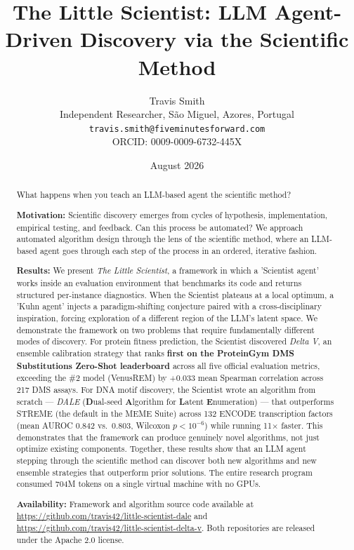 \documentclass[11pt,a4paper]{article}
\title{The Little Scientist: LLM Agent-Driven Discovery via the Scientific Method}
\author{Travis Smith\\
\small Independent Researcher, S\~ao Miguel, Azores, Portugal\\
\texttt{travis.smith@fiveminutesforward.com}\\
\small ORCID: 0009-0009-6732-445X}
\date{August 2026}
\begin{document}
\maketitle

\begin{abstract}
\noindent What happens when you teach an LLM-based agent the scientific method?

\noindent\textbf{Motivation:} Scientific discovery emerges from cycles of hypothesis, implementation, empirical testing, and feedback. Can this process be automated? We approach automated algorithm design through the lens of the scientific method, where an LLM-based agent goes through each step of the process in an ordered, iterative fashion.

\noindent\textbf{Results:} We present \emph{The Little Scientist}, a framework in which a 'Scientist agent' works inside an evaluation environment that benchmarks its code and returns structured per-instance diagnostics. When the Scientist plateaus at a local optimum, a 'Kuhn agent' injects a paradigm-shifting conjecture paired with a cross-disciplinary inspiration, forcing exploration of a different region of the LLM's latent space. We demonstrate the framework on two problems that require fundamentally different modes of discovery. For protein fitness prediction, the Scientist discovered \emph{Delta V}, an ensemble calibration strategy that ranks \textbf{first on the ProteinGym DMS Substitutions Zero-Shot leaderboard} across all five official evaluation metrics, exceeding the \#2 model (VenusREM) by +0.033 mean Spearman correlation across 217 DMS assays. For DNA motif discovery, the Scientist wrote an algorithm from scratch --- \emph{DALE} (\textbf{D}ual-seed \textbf{A}lgorithm for \textbf{L}atent \textbf{E}numeration) --- that outperforms STREME (the default in the MEME Suite) across 132 ENCODE transcription factors (mean AUROC 0.842 vs.\ 0.803, Wilcoxon $p < 10^{-6}$) while running 11$\times$ faster. This demonstrates that the framework can produce genuinely novel algorithms, not just optimize existing components. Together, these results show that an LLM agent stepping through the scientific method can discover both new algorithms and new ensemble strategies that outperform prior solutions.
The entire research program consumed 704M tokens on a single virtual machine with no GPUs.

\noindent\textbf{Availability:} Framework and algorithm source code available at \url{https://github.com/travis42/little-scientist-dale} and \url{https://github.com/travis42/little-scientist-delta-v}. Both repositories are released under the Apache 2.0 license.

\end{abstract}
\end{document}
